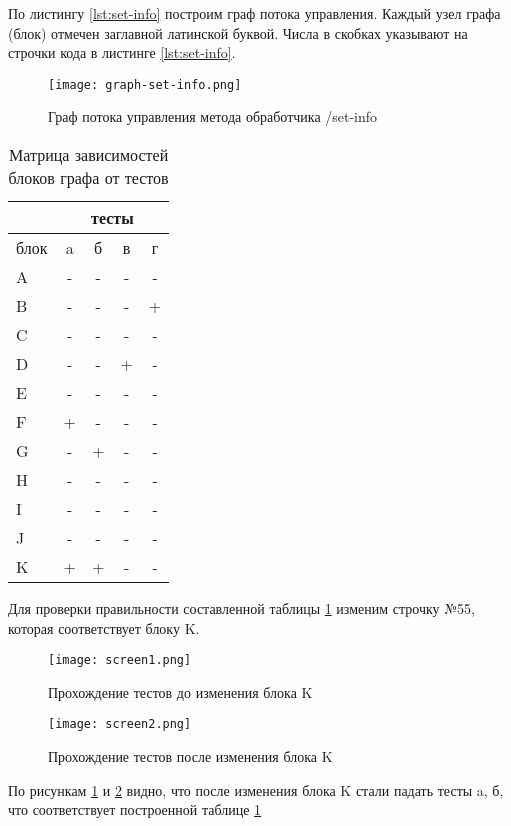 По листингу \ref{lst:set-info} построим граф потока управления. Каждый узел графа (блок) отмечен заглавной латинской буквой. Числа в скобках указывают на строчки кода в листинге \ref{lst:set-info}.

\begin{figure}[H]
  \centering
  \texttt{[image: graph-set-info.png]}
  \caption{Граф потока управления метода обработчика /set-info}
\end{figure}

\begin{table}[H] 
\caption{\label{tab:block_graph-test} Матрица зависимостей блоков графа от тестов}
\begin{center}
\begin{tabular}{|l|c|c|c|c|}

\hline
 & \multicolumn{4}{|c|}{тесты} \\
\hline
блок & a & б & в & г\\
\hline
A & - & - & - & -\\
\hline
B & - & - & - & +\\
\hline
C & - & - & - & -\\
\hline
D & - & - & + & -\\
\hline
E & - & - & - & -\\
\hline
F & + & - & - & -\\
\hline
G & - & + & - & -\\
\hline
H & - & - & - & -\\
\hline
I & - & - & - & -\\
\hline
J & - & - & - & -\\
\hline
K & + & + & - & -\\
\hline
\end{tabular}
\end{center}
\end{table} 

Для проверки правильности составленной таблицы \ref{tab:block_graph-test} изменим строчку №55, которая соответствует блоку K. 

\begin{figure}[H]
  \centering
  \texttt{[image: screen1.png]}
  \caption{Прохождение тестов до изменения блока K}
  \label{image:before-edit}
\end{figure}

\begin{figure}[H]
  \centering
  \texttt{[image: screen2.png]}
  \caption{Прохождение тестов после изменения блока K}
  \label{image:after-edit}
\end{figure}

По рисункам \ref{image:before-edit} и \ref{image:after-edit} видно, что после изменения блока K стали падать тесты a, б, что соответствует построенной таблице \ref{tab:block_graph-test}
